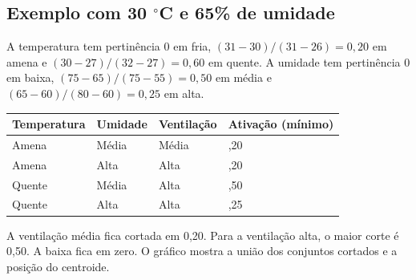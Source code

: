 \documentclass[12pt,a4paper]{article}
\begin{document}
\subsection{Exemplo com 30 $^{\circ}$C e 65\% de umidade}

A temperatura tem pertinência 0 em fria, $(31 - 30)/(31 - 26) = 0,20$ em amena e $(30 - 27)/(32 - 27) = 0,60$ em quente. A umidade tem pertinência 0 em baixa, $(75 - 65)/(75 - 55) = 0,50$ em média e $(65 - 60)/(80 - 60) = 0,25$ em alta.

\begin{table}[htbp]
    \centering
    \begin{tabular}{>{\raggedright\arraybackslash}p{2.8cm} >{\raggedright\arraybackslash}p{2.5cm} >{\raggedright\arraybackslash}p{2.8cm} >{\raggedright\arraybackslash}p{3.8cm}}
        \toprule
        \textbf{Temperatura} & \textbf{Umidade} & \textbf{Ventilação} & \textbf{Ativação (mínimo)} \\
        \midrule
        Amena & Média & Média & 0,20 \\
        \addlinespace
        Amena & Alta & Alta & 0,20 \\
        \addlinespace
        Quente & Média & Alta & 0,50 \\
        \addlinespace
        Quente & Alta & Alta & 0,25 \\
        \bottomrule
    \end{tabular}
\end{table}

A ventilação média fica cortada em 0,20. Para a ventilação alta, o maior corte é 0,50. A baixa fica em zero. O gráfico mostra a união dos conjuntos cortados e a posição do centroide.

\begin{figure}[htbp]
    \centering
\end{figure}
\end{document}
